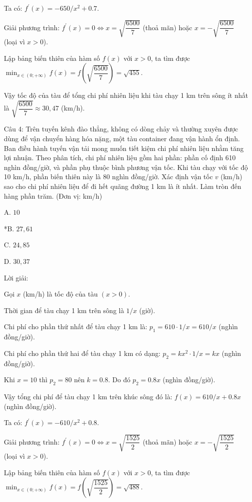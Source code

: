 \documentclass[a4paper,12pt]{article}
\begin{document}
Ta có: \(f^{\prime}(x)=-650/x^2+0.7\).

        Giải phương trình: \(f^{\prime}(x)=0 \Leftrightarrow x=\sqrt{\dfrac{6500}{7}}\) (thoả mãn) hoặc \(x=-\sqrt{\dfrac{6500}{7}}\) (loại vì \(x>0\)).

        Lập bảng biến thiên của hàm số \(f(x)\) với \(x>0\), ta tìm được \(\min_{x \in(0 ;+\infty)} f(x)=f(\sqrt{\dfrac{6500}{7}})=\sqrt{455}\).

        Vậy tốc độ của tàu để tổng chi phí nhiên liệu khi tàu chạy 1 km trên sông ít nhất là \(\sqrt{\dfrac{6500}{7}} \approx 30,47\) (km/h).




Câu 4: Trên tuyến kênh đào thẳng, không có dòng chảy và thường xuyên được dùng để vận chuyển hàng hóa nặng, một tàu container đang vận hành ổn định. Ban điều hành tuyến vận tải mong muốn tiết kiệm chi phí nhiên liệu nhằm tăng lợi nhuận. Theo phân tích, chi phí nhiên liệu gồm hai phần: phần cố định 610 nghìn đồng/giờ, và phần phụ thuộc bình phương vận tốc. Khi tàu chạy với tốc độ 10 km/h, phần biến thiên này là 80 nghìn đồng/giờ. Xác định vận tốc \(v\) (km/h) sao cho chi phí nhiên liệu để đi hết quãng đường 1 km là ít nhất. Làm tròn đến hàng phần trăm. (Đơn vị: km/h)

A. \(10\)

*B. \(27,61\)

C. \(24,85\)

D. \(30,37\)

Lời giải:


Gọi \(x\) (km/h) là tốc độ của tàu \((x > 0)\).

Thời gian để tàu chạy 1 km trên sông là \(1/x\) (giờ).

Chi phí cho phần thứ nhất để tàu chạy 1 km là: \(p_1=610 \cdot 1/x=610/x\) (nghìn đồng/giờ).

Chi phí cho phần thứ hai để tàu chạy 1 km có dạng: \(p_2=k x^2 \cdot 1/x=k x\) (nghìn đồng/giờ).

Khi \(x=10\) thì \(p_2=80\) nên \(k=0.8\). Do đó \(p_2=0.8 x\) (nghìn đồng/giờ).

Vậy tổng chi phí để tàu chạy 1 km trên khúc sông đó là: \(f(x)=610/x+0.8 x\) (nghìn đồng/giờ).

Ta có: \(f^{\prime}(x)=-610/x^2+0.8\).

        Giải phương trình: \(f^{\prime}(x)=0 \Leftrightarrow x=\sqrt{\dfrac{1525}{2}}\) (thoả mãn) hoặc \(x=-\sqrt{\dfrac{1525}{2}}\) (loại vì \(x>0\)).

        Lập bảng biến thiên của hàm số \(f(x)\) với \(x>0\), ta tìm được \(\min_{x \in(0 ;+\infty)} f(x)=f(\sqrt{\dfrac{1525}{2}})=\sqrt{488}\).
\end{document}
